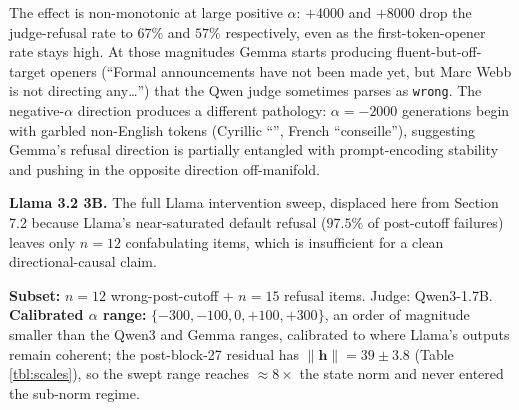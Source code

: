 The effect is non-monotonic at large positive \(\alpha\): \(+4000\) and
\(+8000\) drop the judge-refusal rate to \(67\%\) and \(57\%\)
respectively, even as the first-token-opener rate stays high. At those
magnitudes Gemma starts producing fluent-but-off-target openers
(``Formal announcements have not been made yet, but Marc Webb is not
directing any\ldots{}'') that the Qwen judge sometimes parses as
\texttt{wrong}. The negative-\(\alpha\) direction produces a different
pathology: \(\alpha = -2000\) generations begin with garbled non-English
tokens (Cyrillic ``'', French ``conseille''),
suggesting Gemma's refusal direction is partially entangled with
prompt-encoding stability and pushing in the opposite direction
off-manifold.

\textbf{Llama 3.2 3B.} The full Llama intervention sweep, displaced here
from Section 7.2 because Llama's near-saturated default refusal
(\(97.5\%\) of post-cutoff failures) leaves only \(n=12\) confabulating
items, which is insufficient for a clean directional-causal claim.

\textbf{Subset:} \(n=12\) wrong-post-cutoff + \(n=15\) refusal items.
Judge: Qwen3-1.7B. \textbf{Calibrated \(\alpha\) range:}
\(\{-300, -100, 0, +100, +300\}\), an order of magnitude smaller than
the Qwen3 and Gemma ranges, calibrated to where Llama's outputs remain
coherent; the post-block-27 residual has \(\|\mathbf{h}\| = 39 \pm 3.8\)
(Table \ref{tbl:scales}), so the swept range reaches \(\approx 8\times\)
the state norm and never entered the sub-norm regime.

